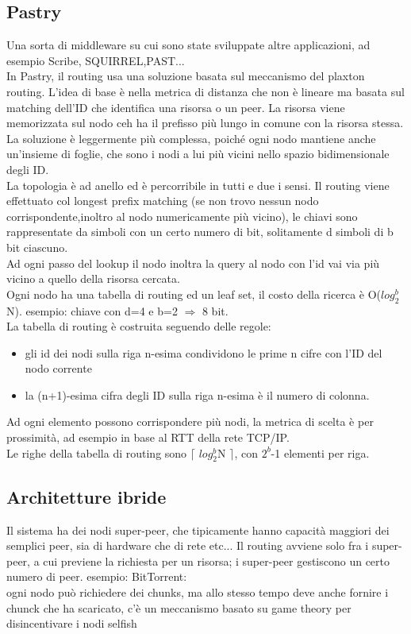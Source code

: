 \documentclass[16px]{article}
\begin{document}
\subsection{Pastry}
Una sorta di middleware su cui sono state sviluppate altre applicazioni, ad esempio Scribe, SQUIRREL,PAST...\\ In Pastry, il routing usa una soluzione basata sul meccanismo del plaxton routing. L'idea di base è nella metrica di distanza che non è lineare ma basata sul matching dell'ID che identifica una risorsa o un peer. La risorsa viene memorizzata sul nodo ceh ha il prefisso più lungo in comune con la risorsa stessa.\\ La soluzione è leggermente più complessa, poiché ogni nodo mantiene anche un'insieme di foglie, che sono i nodi a lui più vicini nello spazio bidimensionale degli ID.\\ La topologia è ad anello ed è percorribile in tutti e due i sensi. Il routing viene effettuato col longest prefix matching (se non trovo nessun nodo corrispondente,inoltro al nodo numericamente più vicino), le chiavi sono rappresentate da simboli con un certo numero di bit, solitamente d simboli di b bit ciascuno.\\ Ad ogni passo del lookup il nodo inoltra la query al nodo con l'id vai via più vicino a quello della risorsa cercata.\\ Ogni nodo ha una tabella di routing ed un leaf set, il costo della ricerca è O($log^b_{2}$N).
esempio: chiave con d=4 e b=2 $\Rightarrow$ 8 bit.\\ La tabella di routing è costruita seguendo delle regole:
\begin{itemize}
\item gli id dei nodi sulla riga n-esima condividono le prime n cifre con l'ID del nodo corrente
\item la (n+1)-esima cifra degli ID sulla riga n-esima è il numero di colonna.
\end{itemize}
Ad ogni elemento possono corrispondere più nodi, la metrica di scelta è per prossimità, ad esempio in base al RTT della rete TCP/IP.\\ Le righe della tabella di routing sono $\lceil$ $log^b_{2}$N $\rceil$, con $2^b$-1 elementi per riga.
\subsection{Architetture ibride}
Il sistema ha dei nodi super-peer, che tipicamente hanno capacità maggiori dei semplici peer, sia di hardware che di rete etc... Il routing avviene solo fra i super-peer, a cui previene la richiesta per un risorsa; i super-peer gestiscono un certo numero di peer. esempio: BitTorrent:\\ ogni nodo può richiedere dei chunks, ma allo stesso tempo deve anche fornire i chunck che ha scaricato, c'è un meccanismo basato su game theory per disincentivare i nodi selfish
\end{document}
